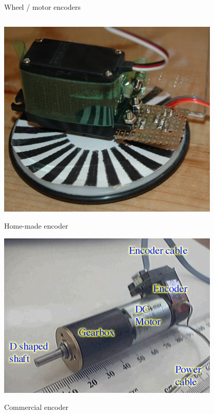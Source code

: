 \documentclass[compress]{beamer}
\begin{document}
\begin{frame}{Wheel / motor encoders}


    \begin{columns}
        \begin{column}{0.5\linewidth}
            \centering

            \includegraphics[width=0.6\linewidth]{encoders3}

            Home-made encoder

            \includegraphics[width=0.6\linewidth]{encoders5}

            Commercial encoder

        \end{column}

        \begin{column}{0.5\linewidth}
            \centering


\end{column}
\end{columns}
\end{frame}
\end{document}
